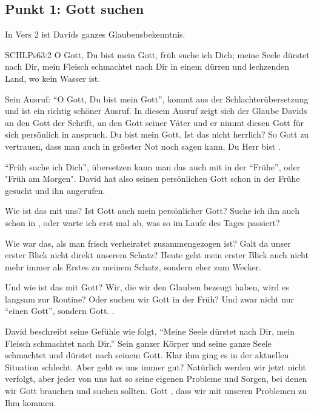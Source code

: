 \documentclass[fontsize=16pt]{mybib}
\begin{document}
    \subsection*{Punkt 1: Gott suchen}
    \begin{otsblock}
    In Vers 2 ist Davids ganzes Glaubensbekenntnis. 
    \begin{bibelbox}{SCHL}{Ps}{63:2}
        O Gott, Du bist mein Gott, früh suche ich Dich; meine Seele dürstet nach Dir, mein Fleisch schmachtet nach Dir in einem dürren und lechzenden Land, wo kein Wasser ist.
    \end{bibelbox}
    Sein Ausruf: \enquote{O Gott, Du bist mein Gott}, kommt aus der Schlachterübersetzung und ist ein richtig schöner Ausruf. In diesem Ausruf zeigt sich der Glaube Davids an den Gott der Schrift, an den Gott seiner Väter und er nimmt diesen Gott für sich persönlich in anspruch. {Du bist mein Gott}. Ist das nicht herrlich? So  Gott zu vertrauen, dass man auch in grösster Not noch sagen kann, Du Herr bist . 

    \enquote{Früh suche ich Dich}, übersetzen kann man das auch mit in der \enquote{Frühe}, oder "Früh am Morgen". David hat also seinen persönlichen Gott schon in der Frühe gesucht und ihn angerufen.
    \end{otsblock}    

    \begin{otsblock}
        Wie ist das mit uns? Ist Gott auch mein persönlicher Gott? Suche ich ihn auch schon in , oder warte ich erst mal ab, was so im Laufe des Tages passiert?

        Wie war das, als man frisch verheiratet zusammengezogen ist? Galt da unser erster Blick nicht direkt unserem Schatz? Heute geht mein erster Blick auch nicht mehr immer als Erstes zu meinem Schatz, sondern eher zum Wecker.

        Und wie ist das mit  Gott? Wir, die wir den Glauben bezeugt haben, wird es langsam zur Routine? Oder suchen wir Gott in der Früh? Und zwar nicht nur \enquote{einen Gott}, sondern  Gott. .

        David beschreibt seine Gefühle wie folgt, \enquote{Meine Seele dürstet nach Dir, mein Fleisch schmachtet nach Dir.} Sein ganzer Körper und seine ganze Seele schmachtet und dürstet nach seinem Gott. Klar ihm ging es in der aktuellen Situation schlecht. Aber geht es uns immer gut? Natürlich werden wir jetzt nicht verfolgt, aber jeder von uns hat so seine eigenen Probleme und Sorgen, bei denen wir Gott brauchen und suchen sollten. Gott , dass wir mit unseren Problemen zu Ihm kommen.
    \end{otsblock}
\end{document}
